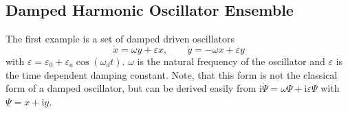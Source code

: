 \documentclass[1p]{elsarticle}
\newcommand {\ii} {\text{i}}
\begin{document}
%
%
\subsection{Damped Harmonic Oscillator Ensemble}

The first example is a set of damped driven oscillators
\begin{equation} \label{eq:dampedsystem}
    \dot{x} = \omega y + \varepsilon x, \quad \quad
    \dot{y} = -\omega x + \varepsilon y
\end{equation}
with $\varepsilon = \varepsilon_0 + \varepsilon_a \cos \left( \omega_d
t \right)$. $\omega$ is the natural frequency of the oscillator and
$\varepsilon$ is the time dependent damping constant.  Note, that this form is
not the classical form of a damped oscillator, but can be derived easily from
$\ii \dot{\Psi} = \omega \Psi + \ii \varepsilon \Psi$ with $\Psi = x + \ii y$.
\end{document}
